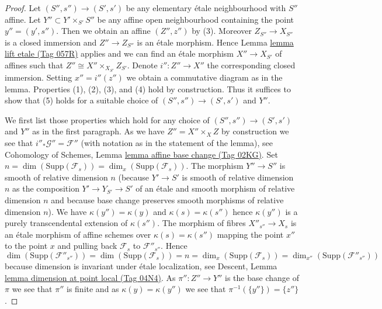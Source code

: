\documentclass{amsart}
\theoremstyle{plain}
\theoremstyle{definition}
\theoremstyle{remark}
\numberwithin{equation}{subsection}
\begin{document}
\begin{proof}
Let $(S'', s'') \to (S', s')$ be any elementary \'etale neighbourhood
with $S''$ affine. Let $Y'' \subset Y' \times_{S'} S''$ be any affine
open neighbourhood containing the point $y'' = (y', s'')$. Then we
obtain an affine $(Z'', z'')$ by (3). Moreover $Z_{S''} \to X_{S''}$
is a closed immersion and $Z'' \to Z_{S''}$ is an \'etale
morphism. Hence
Lemma \href{https://stacks.math.columbia.edu/tag/057R}{lemma lift etale (Tag 057R)}
applies and we can find an \'etale morphism $X'' \to X_{S'}$ of affines
such that $Z'' \cong X'' \times_{X_{S'}} Z_{S'}$. Denote $i'' : Z'' \to X''$
the corresponding closed immersion. Setting $x'' = i''(z'')$ we obtain a
commutative diagram as in the lemma.
Properties (1), (2), (3), and (4) hold by construction.
Thus it suffices to show that (5) holds for a suitable choice of
$(S'', s'') \to (S', s')$ and $Y''$.

\medskip\noindent
We first list those properties which hold for any choice of
$(S'', s'') \to (S', s')$ and $Y''$ as in the first paragraph.
As we have $Z'' = X'' \times_X Z$ by construction we see that
$i''_*\mathcal{G}'' = \mathcal{F}''$ (with notation as in the
statement of the lemma), see
Cohomology of Schemes, Lemma \href{https://stacks.math.columbia.edu/tag/02KG}{lemma affine base change (Tag 02KG)}.
Set $n = \dim(\text{Supp}(\mathcal{F}_s)) = \dim_x(\text{Supp}(\mathcal{F}_s))$.
The morphism $Y'' \to S''$ is smooth of relative dimension $n$
(because $Y' \to S'$ is smooth of relative dimension $n$
as the composition $Y' \to Y_{S'} \to S'$ of an \'etale and
smooth morphism of relative dimension $n$ and because base change
preserves smooth morphisms of relative dimension $n$).
We have $\kappa(y'') = \kappa(y)$ and $\kappa(s) = \kappa(s'')$
hence $\kappa(y'')$ is a purely transcendental extension of $\kappa(s'')$.
The morphism of fibres $X''_{s''} \to X_s$ is an \'etale morphism of affine
schemes over $\kappa(s) = \kappa(s'')$ mapping the point $x''$ to the
point $x$ and pulling back $\mathcal{F}_s$ to $\mathcal{F}''_{s''}$.
Hence
$$
\dim(\text{Supp}(\mathcal{F}''_{s''})) =
\dim(\text{Supp}(\mathcal{F}_s)) = n =
\dim_x(\text{Supp}(\mathcal{F}_s)) =
\dim_{x''}(\text{Supp}(\mathcal{F}''_{s''}))
$$
because dimension is invariant under \'etale localization, see
Descent, Lemma \href{https://stacks.math.columbia.edu/tag/04N4}{lemma dimension at point local (Tag 04N4)}.
As $\pi'' : Z'' \to Y''$ is the base change of $\pi$ we see that
$\pi''$ is finite and as $\kappa(y) = \kappa(y'')$ we see that
$\pi^{-1}(\{y''\}) = \{z''\}$.


\end{proof}
\end{document}
